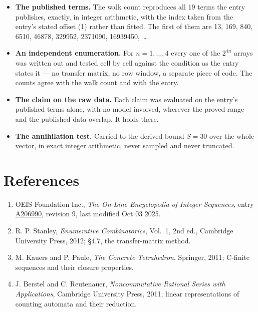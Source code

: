 \documentclass[11pt]{article}
\theoremstyle{definition}
\begin{document}
\begin{itemize}

\item {\bfseries The published terms.} The walk count reproduces all 19 terms the entry publishes, exactly, in integer arithmetic, with the index taken from the entry's stated offset (1) rather than fitted. The first of them are 13, 169, 840, 6510, 46878, 329952, 2371090, 16939450,~\dots

\item {\bfseries An independent enumeration.} For $n = 1,\dots,4$ every one of the $2^{4n}$ arrays was written out and tested cell by cell against the condition as the entry states it --- no transfer matrix, no row window, a separate piece of code. The counts agree with the walk count and with the entry.

\item {\bfseries The claim on the raw data.} Each claim was evaluated on the entry's published terms alone, with no model involved, wherever the proved range and the published data overlap. It holds there.

\item {\bfseries The annihilation test.} Carried to the derived bound $S = 30$ over the whole vector, in exact integer arithmetic, never sampled and never truncated.

\end{itemize}

\section{References}

\begin{enumerate}

\item OEIS Foundation Inc., \emph{The On-Line Encyclopedia of Integer Sequences}, entry \href{https://oeis.org/A206990}{A206990}, revision 9, last modified Oct 03 2025.

\item R. P. Stanley, \emph{Enumerative Combinatorics}, Vol.~1, 2nd ed., Cambridge University Press, 2012; \S4.7, the transfer-matrix method.

\item M. Kauers and P. Paule, \emph{The Concrete Tetrahedron}, Springer, 2011; C-finite sequences and their closure properties.

\item J. Berstel and C. Reutenauer, \emph{Noncommutative Rational Series with Applications}, Cambridge University Press, 2011; linear representations of counting automata and their reduction.

\end{enumerate}
\end{document}
